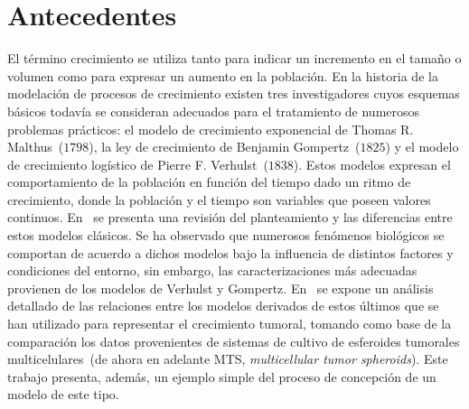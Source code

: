 \section{Antecedentes}
El t\'ermino crecimiento se utiliza tanto para indicar un incremento en el tama\~no o volumen como para expresar un aumento en la poblaci\'on. En la historia de la modelaci\'on de procesos de crecimiento existen tres investigadores cuyos esquemas b\'asicos todav\'ia se consideran adecuados para el tratamiento de numerosos problemas pr\'acticos: el modelo de crecimiento exponencial de Thomas R. Malthus~($1798$), la ley de crecimiento de Benjamin Gompertz~($1825$) y el modelo de crecimiento log\'istico de Pierre F. Verhulst~($1838$). Estos modelos expresan el comportamiento de la poblaci\'on en funci\'on del tiempo dado un ritmo de crecimiento, donde la poblaci\'on y el tiempo son variables que poseen valores continuos. En~\cite[p\'aginas $129$-$131$]{book} se presenta una revisi\'on del planteamiento y las diferencias entre estos modelos cl\'asicos. Se ha observado que numerosos fen\'omenos biol\'ogicos se comportan de acuerdo a dichos modelos bajo la influencia de distintos factores y condiciones del entorno, sin embargo, las caracterizaciones m\'as adecuadas provienen de los modelos de Verhulst y Gompertz. En~\cite{gompertz} se expone un an\'alisis detallado de las relaciones entre los modelos derivados de estos \'ultimos que se han utilizado para representar el crecimiento tumoral, tomando como base de la comparaci\'on los datos provenientes de sistemas de cultivo de esferoides tumorales multicelulares~(de ahora en adelante MTS, \emph{multicellular tumor spheroids}). Este trabajo presenta, adem\'as, un ejemplo simple del proceso de concepci\'on de un modelo de este tipo.

